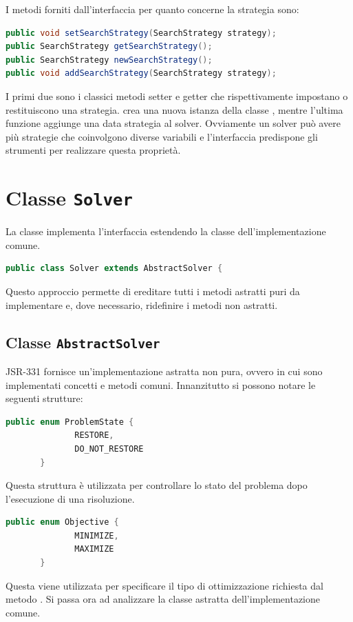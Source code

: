 I metodi forniti dall'interfaccia per quanto concerne la strategia sono:
\begin{lstlisting}[language = Java,
                   frame = single]
public void setSearchStrategy(SearchStrategy strategy); 
public SearchStrategy getSearchStrategy(); 
public SearchStrategy newSearchStrategy(); 
public void addSearchStrategy(SearchStrategy strategy); 
\end{lstlisting}
I primi due sono i classici metodi setter e getter che rispettivamente 
impostano o restituiscono una strategia.  crea
una nuova istanza della classe , mentre l'ultima
funzione aggiunge una data strategia al solver. Ovviamente un solver
può avere più strategie che coinvolgono diverse variabili e l'interfaccia
predispone gli strumenti per realizzare questa proprietà.

\section{Classe \texttt{Solver}}\label{jsetlsolver}
La classe  implementa l'interfaccia 
estendendo la classe  dell'implementazione comune.
\begin{lstlisting}[language = Java, frame = single]
public class Solver extends AbstractSolver {
\end{lstlisting}

Questo approccio permette di ereditare tutti i metodi astratti puri da 
implementare e, dove necessario, ridefinire i metodi non astratti.

\subsection{Classe \texttt{AbstractSolver}}
JSR-331 fornisce un'implementazione astratta non pura, ovvero in cui sono
implementati concetti e metodi comuni. Innanzitutto si possono notare
le seguenti strutture:
\begin{lstlisting}[language = Java,
                   frame = single]
       public enum ProblemState {
              RESTORE,
              DO_NOT_RESTORE
       }
\end{lstlisting}
Questa struttura è utilizzata per controllare lo stato del problema dopo
l'esecuzione di una risoluzione.
\begin{lstlisting}[language = Java,
                   frame = single]
       public enum Objective {
              MINIMIZE,
              MAXIMIZE
       }
\end{lstlisting}
Questa viene utilizzata per specificare il tipo di ottimizzazione richiesta
dal metodo . Si passa ora ad analizzare la classe
astratta dell'implementazione comune.


